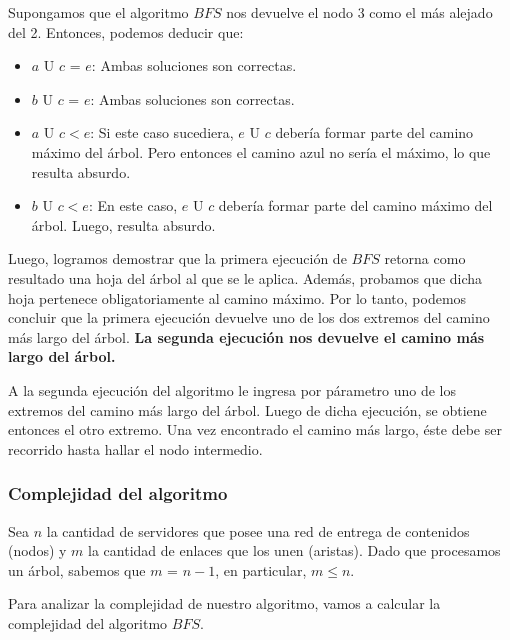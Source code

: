 \begin{itemize}
Supongamos que el algoritmo $BFS$ nos devuelve el nodo 3 como el más alejado del 2. Entonces, podemos deducir que:
\begin {itemize}
\item $a$ U $c$ = $e$: \newline Ambas soluciones son correctas.
\item $b$ U $c$ = $e$: \newline Ambas soluciones son correctas.
\item $a$ U $c<e$: \newline Si este caso sucediera, $e$ U $c$ debería formar parte del camino máximo del árbol. Pero entonces el camino azul no sería el máximo, lo que resulta absurdo.
\item $b$ U $c<e$: \newline En este caso, $e$ U $c$ debería formar parte del camino máximo del árbol. Luego, resulta absurdo.
\newline
\end{itemize}
\end{itemize}

Luego, logramos demostrar que la primera ejecución de $BFS$ retorna como resultado una hoja del árbol al que se le aplica. Además, probamos que dicha hoja pertenece obligatoriamente al camino máximo. Por lo tanto, podemos concluir que la primera ejecución devuelve uno de los dos extremos del camino más largo del árbol. \newline
\newline
\textbf{La segunda ejecución nos devuelve el camino más largo del árbol.} \newline

A la segunda ejecución del algoritmo le ingresa por párametro uno de los extremos del camino más largo del árbol. Luego de dicha ejecución, se obtiene entonces el otro extremo. Una vez encontrado el camino más largo, éste debe ser recorrido hasta hallar el nodo intermedio.
\subsubsection{Complejidad del algoritmo}

Sea $n$ la cantidad de servidores que posee una red de entrega de contenidos (nodos) y $m$ la cantidad de enlaces que los unen (aristas). Dado que procesamos un árbol, sabemos que $m$ = $n-1$, en particular, $m \leq n$.\newline

Para analizar la complejidad de nuestro algoritmo, vamos a calcular la complejidad del algoritmo $BFS$.
\newline

